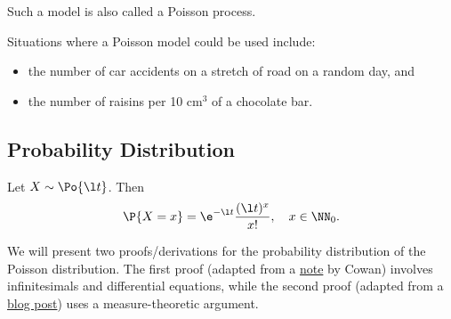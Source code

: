 Such a model is also called a Poisson process.

Situations where a Poisson model could be used include:
\begin{itemize}
    \item the number of car accidents on a stretch of road on a random day, and
    \item the number of raisins per 10 cm$^3$ of a chocolate bar.
\end{itemize}

\subsection{Probability Distribution}

\begin{proposition}
    Let $X \sim \Po{\l t}$. Then \[\P{X = x} = \e^{-\l t} \frac{(\l t)^x}{x!}, \quad x \in \NN_{0}.\]
\end{proposition}
We will present two proofs/derivations for the probability distribution of the Poisson distribution. The first proof (adapted from a \href{https://www.pp.rhul.ac.uk/~cowan/stat/notes/PoissonNote.pdf}{note} by Cowan) involves infinitesimals and differential equations, while the second proof (adapted from a \href{https://blog.kalculate.ai/2024/03/27/poisson-distribution/}{blog post}) uses a measure-theoretic argument.
